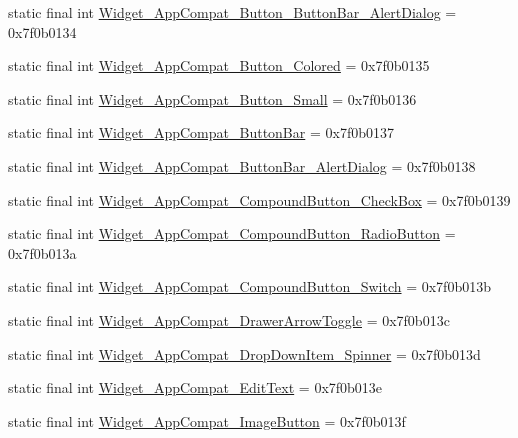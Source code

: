\begin{CompactItemize}
\item 
static final int \hyperlink{classandroid_1_1support_1_1v7_1_1mediarouter_1_1_r_1_1style_524722f570d82aaa9d7b72732f8bca4c}{Widget\_\-AppCompat\_\-Button\_\-ButtonBar\_\-AlertDialog} = 0x7f0b0134
\item 
static final int \hyperlink{classandroid_1_1support_1_1v7_1_1mediarouter_1_1_r_1_1style_ba97ff48183e8ccd51e5aad5835ad865}{Widget\_\-AppCompat\_\-Button\_\-Colored} = 0x7f0b0135
\item 
static final int \hyperlink{classandroid_1_1support_1_1v7_1_1mediarouter_1_1_r_1_1style_6a9b1264a504b5a09e1391fff2c989ea}{Widget\_\-AppCompat\_\-Button\_\-Small} = 0x7f0b0136
\item 
static final int \hyperlink{classandroid_1_1support_1_1v7_1_1mediarouter_1_1_r_1_1style_86104e8d4640fe990c03399f0cf6a653}{Widget\_\-AppCompat\_\-ButtonBar} = 0x7f0b0137
\item 
static final int \hyperlink{classandroid_1_1support_1_1v7_1_1mediarouter_1_1_r_1_1style_5a26e1bda5a70245dd8616d7490f1c9d}{Widget\_\-AppCompat\_\-ButtonBar\_\-AlertDialog} = 0x7f0b0138
\item 
static final int \hyperlink{classandroid_1_1support_1_1v7_1_1mediarouter_1_1_r_1_1style_cf361106d0af02c0a234e0a75e6a8b4d}{Widget\_\-AppCompat\_\-CompoundButton\_\-CheckBox} = 0x7f0b0139
\item 
static final int \hyperlink{classandroid_1_1support_1_1v7_1_1mediarouter_1_1_r_1_1style_f81d22a275d01961cb3f6d7b9dd53750}{Widget\_\-AppCompat\_\-CompoundButton\_\-RadioButton} = 0x7f0b013a
\item 
static final int \hyperlink{classandroid_1_1support_1_1v7_1_1mediarouter_1_1_r_1_1style_7c62bb3a5f22c9854529151c223efaa6}{Widget\_\-AppCompat\_\-CompoundButton\_\-Switch} = 0x7f0b013b
\item 
static final int \hyperlink{classandroid_1_1support_1_1v7_1_1mediarouter_1_1_r_1_1style_e9bceaf49d097e51187f498c11450941}{Widget\_\-AppCompat\_\-DrawerArrowToggle} = 0x7f0b013c
\item 
static final int \hyperlink{classandroid_1_1support_1_1v7_1_1mediarouter_1_1_r_1_1style_5817ec072b085b4be5b7170c352074c9}{Widget\_\-AppCompat\_\-DropDownItem\_\-Spinner} = 0x7f0b013d
\item 
static final int \hyperlink{classandroid_1_1support_1_1v7_1_1mediarouter_1_1_r_1_1style_dbaf74ff804647e522fce683a9bc64dd}{Widget\_\-AppCompat\_\-EditText} = 0x7f0b013e
\item 
static final int \hyperlink{classandroid_1_1support_1_1v7_1_1mediarouter_1_1_r_1_1style_f11ba722107f6c8f792f50bf37337698}{Widget\_\-AppCompat\_\-ImageButton} = 0x7f0b013f

\end{CompactItemize}
